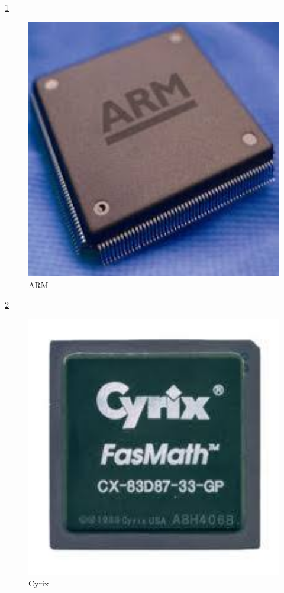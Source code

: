 \ref{ARM}
\begin{figure}[ht]
\centerline{\includegraphics[width=1\textwidth]{figures/ARM.jpg}}
\caption{ARM}
\label{ARM}
\end{figure}

\ref{Cyrix}
\begin{figure}[ht]
\centerline{\includegraphics[width=1\textwidth]{figures/Cyrix.jpg}}
\caption{Cyrix}
\label{Cyrix}
\end{figure}

